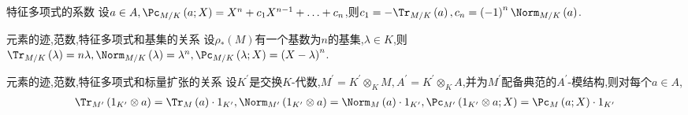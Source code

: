 \begin{proposition}{特征多项式的系数}{}
	设$a\in A,\Pc_{M/K}\left(a;X\right)=X^{n}+c_{1}X^{n-1}+\ldots+c_{n}$,则$c_{1}=-\Tr_{M/K}\left(a\right),c_{n}=\left(-1\right)^{n}\Norm_{M/K}\left(a\right)$.
\end{proposition}

\begin{proposition}{元素的迹,范数,特征多项式和基集的关系}{}
	设$\rho_{\ast}\left(M\right)$有一个基数为$n$的基集,$\lambda\in K$,则$\Tr_{M/K}\left(\lambda\right)=n\lambda,\Norm_{M/K}\left(\lambda\right)=\lambda^{n},\Pc_{M/K}\left(\lambda;X\right)=\left(X-\lambda\right)^{n}$.
\end{proposition}

\begin{proposition}{元素的迹,范数,特征多项式和标量扩张的关系}{}
	设$K^{\prime}$是交换$K$-代数,$M^{\prime}=K^{\prime}\otimes_{K}M,A^{\prime}=K^{\prime}\otimes_{K}A$,并为$M^{\prime}$配备典范的$A^{\prime}$-模结构,则对每个$a\in A$,
	\begin{gather*}
		\Tr_{M^{\prime}}\left(1_{K^{\prime}}\otimes a\right)=\Tr_{M}\left(a\right)\cdot 1_{K^{\prime}},
		\Norm_{M^{\prime}}\left(1_{K^{\prime}}\otimes a\right)=\Norm_{M}\left(a\right)\cdot 1_{K^{\prime}},
		\Pc_{M^{\prime}}\left(1_{K^{\prime}}\otimes a;X\right)=\Pc_{M}\left(a;X\right)\cdot 1_{K^{\prime}}
	\end{gather*}
\end{proposition}




























